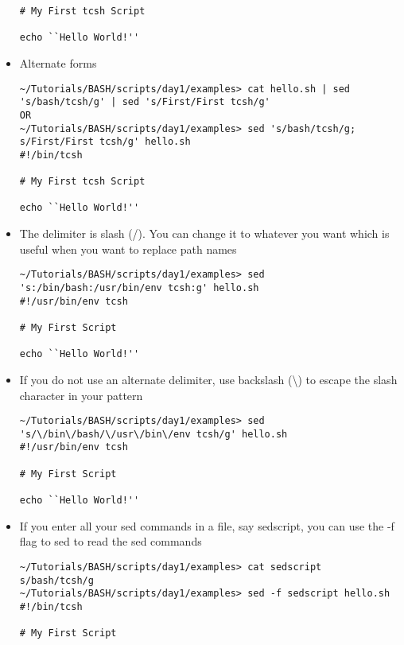 \documentclass[10pt,t]{beamer}
\begin{document}
\begin{frame}
\begin{itemize}
\begin{lstlisting}[style=LINUX]
# My First tcsh Script

echo ``Hello World!''
      \end{lstlisting}
    \item Alternate forms
      \begin{lstlisting}[style=LINUX]
~/Tutorials/BASH/scripts/day1/examples> cat hello.sh | sed 's/bash/tcsh/g' | sed 's/First/First tcsh/g'
OR
~/Tutorials/BASH/scripts/day1/examples> sed 's/bash/tcsh/g; s/First/First tcsh/g' hello.sh 
#!/bin/tcsh

# My First tcsh Script

echo ``Hello World!''
      \end{lstlisting}
    \item The delimiter is slash (/). You can change it to whatever you want which is useful when you want to replace path names
      \begin{lstlisting}[style=LINUX]
~/Tutorials/BASH/scripts/day1/examples> sed 's:/bin/bash:/usr/bin/env tcsh:g' hello.sh 
#!/usr/bin/env tcsh

# My First Script

echo ``Hello World!''
      \end{lstlisting}
      \framebreak
    \item If you do not use an alternate delimiter, use backslash (\textbackslash) to escape the slash character in your pattern
      \begin{lstlisting}[style=LINUX]
~/Tutorials/BASH/scripts/day1/examples> sed 's/\/bin\/bash/\/usr\/bin\/env tcsh/g' hello.sh 
#!/usr/bin/env tcsh

# My First Script

echo ``Hello World!''
      \end{lstlisting}
    \item If you enter all your sed commands in a file, say sedscript, you can use the -f flag to sed to read the sed commands
      \begin{lstlisting}[style=LINUX]
~/Tutorials/BASH/scripts/day1/examples> cat sedscript
s/bash/tcsh/g
~/Tutorials/BASH/scripts/day1/examples> sed -f sedscript hello.sh 
#!/bin/tcsh

# My First Script


\end{lstlisting}
\end{itemize}
\end{frame}
\end{document}
